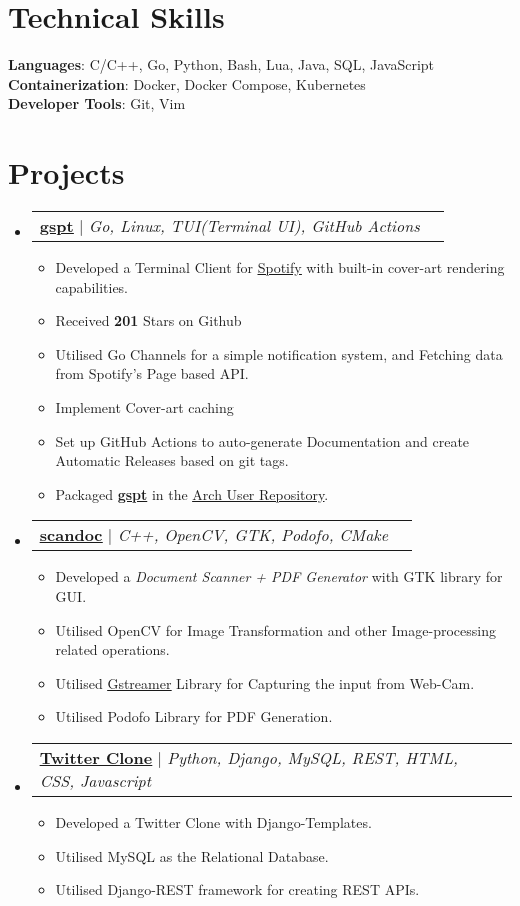 \documentclass[letterpaper,11pt]{article}
\makeatletter
\def\gsptstars{201}
\newcommand{\resumeItem}[1]{
  \item\small{
    {#1 \vspace{-2pt}}
  }
}
\newcommand{\resumeProjectHeading}[2]{
    \item
    \begin{tabular*}{0.97\textwidth}{l@{\extracolsep{\fill}}r}
      \small#1 & #2 \\
    \end{tabular*}\vspace{-7pt}
}
\newcommand{\resumeSubHeadingListStart}{\begin{itemize}[leftmargin=0.15in, label={}]}
\newcommand{\resumeSubHeadingListEnd}{\end{itemize}}
\newcommand{\resumeItemListStart}{\begin{itemize}}
\newcommand{\resumeItemListEnd}{\end{itemize}\vspace{-5pt}}
\makeatother
\begin{document}
\section{Technical Skills}
 \begin{itemize}[leftmargin=0.15in, label={}]
    \small{\item{
     \textbf{Languages}{: C/C++, Go, Python, Bash, Lua, Java, SQL, JavaScript} \\
     \textbf{Containerization}{: Docker, Docker Compose, Kubernetes} \\
     \textbf{Developer Tools}{: Git, Vim} \\
    }}
 \end{itemize}



\section{Projects}
    \resumeSubHeadingListStart
      \resumeProjectHeading
          {\textbf{\href{https://github.com/aditya-K2/gspt}{\underline{gspt}}} $|$ \emph{Go, Linux, TUI(Terminal UI), GitHub Actions}}{}
          \resumeItemListStart
            \resumeItem{Developed a Terminal Client for \href{https://www.spotify.com/}{\underline{Spotify}} with built-in cover-art rendering capabilities.}
            \resumeItem{Received \textbf{\gsptstars} Stars on Github}
            \resumeItem{Utilised Go Channels for a simple notification system, and Fetching data from Spotify's Page based API.}
            \resumeItem{Implement Cover-art caching}
            \resumeItem{Set up GitHub Actions to auto-generate Documentation and create Automatic Releases based on git tags.}
            \resumeItem{Packaged \href{https://github.com/aditya-K2/gspt}{\textbf{gspt}} in the \href{https://aur.archlinux.org/packages/gspt-git}{\underline{Arch User Repository}}.}
          \resumeItemListEnd
      \resumeProjectHeading
          {\textbf{\href{https://github.com/aditya-K2/scandoc}{\underline{scandoc}}} $|$ \emph{C++, OpenCV, GTK, Podofo, CMake}}{}
          \resumeItemListStart
            \resumeItem{Developed a \textit{Document Scanner + PDF Generator} with GTK library for GUI.}
            \resumeItem{Utilised OpenCV for Image Transformation and other Image-processing related operations.}
            \resumeItem{Utilised \href{https://gstreamer.freedesktop.org/}{\underline{Gstreamer}} Library for Capturing the input from Web-Cam.}
            \resumeItem{Utilised Podofo Library for PDF Generation.}
          \resumeItemListEnd
      \resumeProjectHeading
          {\textbf{\href{https://github.com/aditya-K2/twitterclone}{\underline{Twitter Clone}}} $|$ \emph{Python, Django, MySQL, REST, HTML, CSS, Javascript}}{}
          \resumeItemListStart
            \resumeItem{Developed a Twitter Clone with Django-Templates. }
            \resumeItem{Utilised MySQL as the Relational Database.}
            \resumeItem{Utilised Django-REST framework for creating REST APIs.}
          \resumeItemListEnd
    \resumeSubHeadingListEnd
\end{document}
